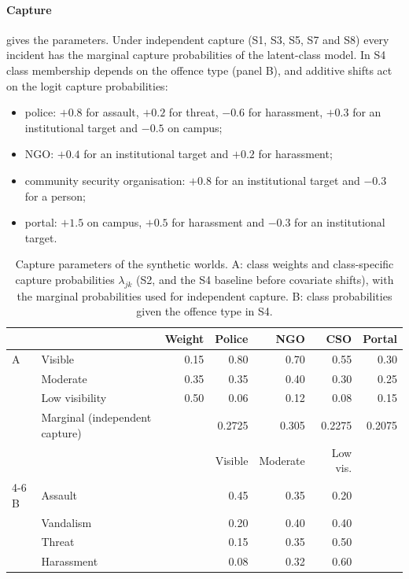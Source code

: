 \paragraph{Capture}  gives the parameters. Under independent capture (S1, S3, S5, S7 and S8) every incident has the marginal capture probabilities of the latent-class model. In S4 class membership depends on the offence type (panel B), and additive shifts act on the logit capture probabilities:
\begin{itemize}
  \item police: $+0.8$ for assault, $+0.2$ for threat, $-0.6$ for harassment, $+0.3$ for an institutional target and $-0.5$ on campus;
  \item NGO: $+0.4$ for an institutional target and $+0.2$ for harassment;
  \item community security organisation: $+0.8$ for an institutional target and $-0.3$ for a person;
  \item portal: $+1.5$ on campus, $+0.5$ for harassment and $-0.3$ for an institutional target.
\end{itemize}

\begin{table}[tp]
\centering
\caption{Capture parameters of the synthetic worlds. A: class weights and class-specific capture probabilities $\lambda_{jk}$ (S2, and the S4 baseline before covariate shifts), with the marginal probabilities used for independent capture. B: class probabilities given the offence type in S4.}\label{tab:sim-capture}
\small
\begin{tabular}{@{}llrrrrr@{}}
\toprule
 & & Weight & Police & NGO & CSO & Portal \\
\midrule
A & Visible & 0.15 & 0.80 & 0.70 & 0.55 & 0.30 \\
 & Moderate & 0.35 & 0.35 & 0.40 & 0.30 & 0.25 \\
 & Low visibility & 0.50 & 0.06 & 0.12 & 0.08 & 0.15 \\
 & Marginal (independent capture) & & 0.2725 & 0.305 & 0.2275 & 0.2075 \\
\midrule
 & & & Visible & Moderate & Low vis. & \\
\cmidrule(lr){4-6}
B & Assault & & 0.45 & 0.35 & 0.20 & \\
 & Vandalism & & 0.20 & 0.40 & 0.40 & \\
 & Threat & & 0.15 & 0.35 & 0.50 & \\
 & Harassment & & 0.08 & 0.32 & 0.60 & \\
\bottomrule
\end{tabular}
\end{table}

